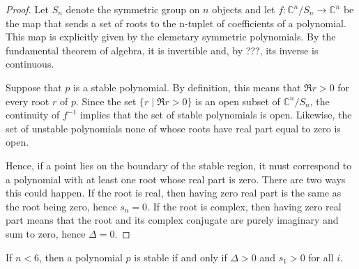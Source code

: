 \begin{proof}
Let $S_n$ denote the symmetric group on $n$ objects and let $f \colon
\mathbb{C}^n/S_n \to \mathbb{C}^n$ be the map that sends a set of roots
to the n-tuplet of coefficients of a polynomial.  This map is explicitly
given by the elemetary symmetric polynomials.  By the fundamental theorem
of algebra, it is invertible and, by ???, its inverse is continuous.

Suppose that $p$ is a stable polynomial.  By definition, this means that
$\Re r > 0$ for every root $r$ of $p$.  Since the set $\{r \mid \Re r > 0\}$
is an open subset of $\mathbb{C}^n/S_n$, the continuity of $f^{-1}$ implies
that the set of stable polynomials is open.  Likewise, the set of unstable
polynomials none of whose roots have real part equal to zero is open.

Hence, if a point lies on the boundary of the stable region, it must
correspond to a polynomial with at least one root whose real part is zero.
There are two ways this could happen.  If the root is real, then having
zero real part is the same as the root being zero, hence $s_n = 0$.  If
the root is complex, then having zero real part means that the root and
its complex conjugate are purely imaginary and sum to zero, hence $\Delta = 0$.
\end{proof}

\begin{lemma}
If $n < 6$, then a polynomial $p$ is stable if and only
if $\Delta > 0$ and $s_1 > 0$ for all $i$.
\end{lemma}


